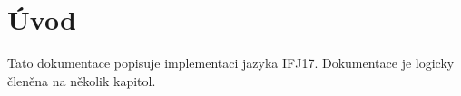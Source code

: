 \section{Úvod}
Tato dokumentace popisuje implementaci jazyka IFJ17. Dokumentace je logicky členěna na několik kapitol.

